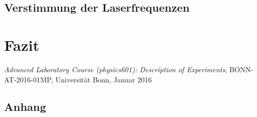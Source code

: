 \documentclass[11pt, a4paper]{article}
\numberwithin{equation}{section}
\begin{document}
\subsection{Verstimmung der Laserfrequenzen}






\section{Fazit}


\FloatBarrier
\vspace{\fill}
\begin{thebibliography}{19}
	\emph{Advanced Laboratory Course (physics601): Description of Experiments}, BONN-AT-2016-01MP, Universität Bonn, Januar 2016
\end{thebibliography}

\begin{appendix}
\newpage
\section{Anhang}
\end{appendix}
\end{document}
